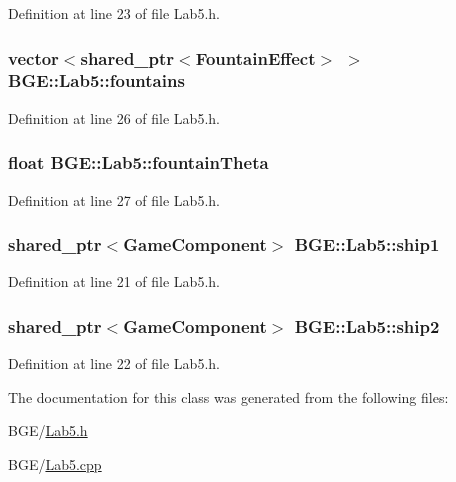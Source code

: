 Definition at line 23 of file Lab5.\-h.

\hypertarget{class_b_g_e_1_1_lab5_abb82b6dc823adc6bf2a191b90b129c2c}{
\subsubsection[{fountains}]{\setlength{\rightskip}{0pt plus 5cm}vector$<$shared\-\_\-ptr$<${\bf Fountain\-Effect}$>$ $>$ B\-G\-E\-::\-Lab5\-::fountains}}\label{class_b_g_e_1_1_lab5_abb82b6dc823adc6bf2a191b90b129c2c}


Definition at line 26 of file Lab5.\-h.

\hypertarget{class_b_g_e_1_1_lab5_a94ed12fbc88b8a8deed8e63ab0959492}{
\subsubsection[{fountain\-Theta}]{\setlength{\rightskip}{0pt plus 5cm}float B\-G\-E\-::\-Lab5\-::fountain\-Theta}}\label{class_b_g_e_1_1_lab5_a94ed12fbc88b8a8deed8e63ab0959492}


Definition at line 27 of file Lab5.\-h.

\hypertarget{class_b_g_e_1_1_lab5_a952366bdf456d393673447ec0a0d5a2c}{
\subsubsection[{ship1}]{\setlength{\rightskip}{0pt plus 5cm}shared\-\_\-ptr$<${\bf Game\-Component}$>$ B\-G\-E\-::\-Lab5\-::ship1}}\label{class_b_g_e_1_1_lab5_a952366bdf456d393673447ec0a0d5a2c}


Definition at line 21 of file Lab5.\-h.

\hypertarget{class_b_g_e_1_1_lab5_a89e6f26fd06f91ace95ab789e8f5a4d8}{
\subsubsection[{ship2}]{\setlength{\rightskip}{0pt plus 5cm}shared\-\_\-ptr$<${\bf Game\-Component}$>$ B\-G\-E\-::\-Lab5\-::ship2}}\label{class_b_g_e_1_1_lab5_a89e6f26fd06f91ace95ab789e8f5a4d8}


Definition at line 22 of file Lab5.\-h.



The documentation for this class was generated from the following files\-:\begin{DoxyCompactItemize}
\item 
B\-G\-E/\hyperlink{_lab5_8h}{Lab5.\-h}\item 
B\-G\-E/\hyperlink{_lab5_8cpp}{Lab5.\-cpp}\end{DoxyCompactItemize}
